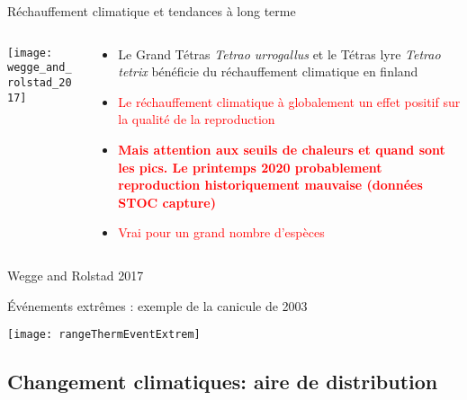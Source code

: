 \documentclass[10pt]{beamer}
\begin{document}
\begin{frame}{Réchauffement climatique et tendances à long terme}
  \begin{columns}[c]
    \begin{column}[c]{0.5\textwidth}
      \begin{center}
   \texttt{[image: wegge\_and\_rolstad\_2017]}\\
 \end{center}
    \end{column}
    \begin{column}[c]{0.5\textwidth}
   
    \begin{itemize}
    \item <2> Le Grand Tétras \textit{Tetrao urrogallus} et le Tétras lyre \textit{Tetrao tetrix} bénéficie du réchauffement climatique en finland
    \item <3> \textcolor{red}{Le réchauffement climatique à globalement un effet positif sur la qualité de la reproduction}
    \item <3> \textcolor{red}{\textbf{Mais attention aux seuils de chaleurs et quand sont les pics. Le printemps 2020 probablement reproduction historiquement mauvaise (données STOC capture)}}
     \item <3> \textcolor{red}{Vrai pour un grand nombre d'espèces}
    
   \end{itemize}
    
    \end{column}
  \end{columns}

   \begin{tiny}
    Wegge and Rolstad 2017
  \end{tiny}

\end{frame}




\begin{frame}{Événements extrêmes : \small{exemple de la canicule de 2003}}
  \begin{center}
   \texttt{[image: rangeThermEventExtrem]}
  \end{center}
  \end{frame}

  
  
  
\subsection{Changement climatiques: aire de distribution}
\end{document}
